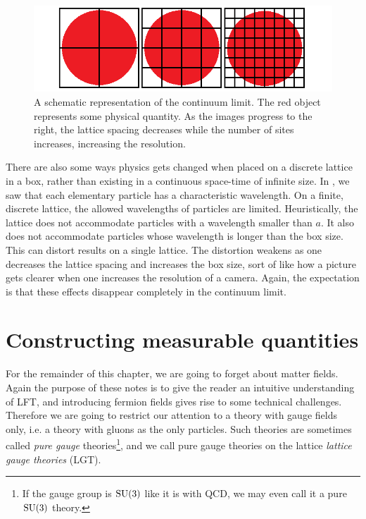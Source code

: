 \begin{figure}
  \centering
  \includegraphics[width=0.9\linewidth]{figs/continuumlimit.png}
  \caption{A schematic representation of the continuum limit. The
           red object represents some physical quantity. As the
           images progress to the right, the lattice spacing decreases
           while the number of sites increases, increasing the resolution.}
  \label{fig:climit}
\end{figure}


There are also some ways physics gets changed when placed on a
discrete lattice in a box, rather than existing in a continuous space-time of
infinite size. In , we saw that each elementary particle has a
characteristic wavelength. On a finite, discrete lattice, the allowed wavelengths 
of particles are limited.
Heuristically, the lattice does not accommodate particles with a wavelength
smaller than $a$. It also does not accommodate particles whose wavelength is
longer than the box size. This can distort results on a single lattice. The
distortion weakens as one decreases the lattice spacing and increases the box
size, sort of like how a picture gets clearer when one increases the resolution
of a camera. Again, the expectation is that these effects disappear completely
in the continuum limit. 


\section{Constructing measurable quantities}

For the remainder of this chapter, we are going to forget about matter fields.
Again the purpose of these notes is to give the reader an intuitive
understanding of LFT, and introducing fermion fields gives rise to some
technical challenges. Therefore we are going to restrict our attention to a
theory with gauge fields only, i.e. a theory with gluons as the only particles.
Such theories are sometimes called {\it pure gauge} theories\footnote{If the
gauge group is $\operatorname{SU}(3)$ like it is with QCD, we may even call it a pure
$\operatorname{SU}(3)$ theory.}, and we call
pure gauge theories on the lattice {\it lattice gauge theories} (LGT).


